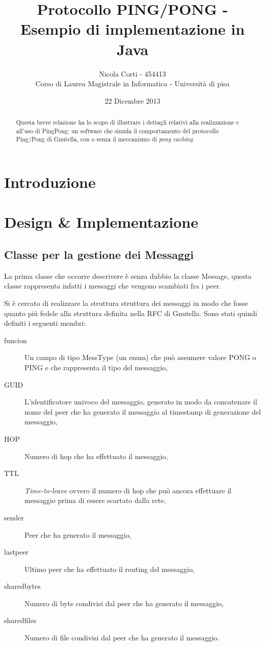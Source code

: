 \documentclass[a4paper,11pt]{article}
\title{Protocollo PING/PONG - Esempio di implementazione in Java}
\author{Nicola Corti - 454413 \\Corso di Laurea Magistrale in Informatica - Universit\`a di pisa}
\date{22 Dicembre 2013}
\begin{document}
\maketitle
 
\begin{abstract}
Questa breve relazione ha lo scopo di illustrare i dettagli relativi  alla realizzazione e all'uso di \textsf{PingPong}: un software che simula il comportamento del protocollo Ping/Pong di Gnutella, con o senza il meccanismo di \emph{pong caching}.
\end{abstract}

\tableofcontents

\section*{Introduzione}

\section{Design \& Implementazione}
\label{sec:design}


\subsection{Classe per la gestione dei Messaggi}

La prima classe che occorre descrivere \`e senza dubbio la classe \textsf{Message}, questa classe rappresenta infatti i messaggi che vengono scambiati fra i peer.

Si \`e cercato di realizzare la struttura struttura dei messaggi in modo che fosse quanto pi\`u fedele alla struttura definita nella RFC di Gnutella. Sono stati quindi definiti i seguenti membri:

\begin{description}
\item[\textsf{funcion}] Un campo di tipo \textsf{MessType} (un \textsf{enum}) che pu\`o assumere valore \textsf{PONG} o \textsf{PING} e che rappresenta il tipo del messaggio,
\item[\textsf{GUID}] L'identificatore univoco del messaggio, generato in modo da concatenare il nome del peer che ha generato il messaggio al timestamp di generazione del messaggio,
\item[\textsf{HOP}] Numero di hop che ha effettuato il messaggio,
\item[\textsf{TTL}] \emph{Time-to-leave} ovvero il numero di hop che pu\`o ancora effettuare il messaggio prima di essere scartato dalla rete,
\item[\textsf{sender}] Peer che ha generato il messaggio,
\item[\textsf{lastpeer}] Ultimo peer che ha effettuato il routing del messaggio,
\item[\textsf{sharedbytes}] Numero di byte condivisi dal peer che ha generato il messaggio,
\item[\textsf{sharedfiles}] Numero di file condivisi dal peer che ha generato il messaggio.
\end{description}
\end{document}

